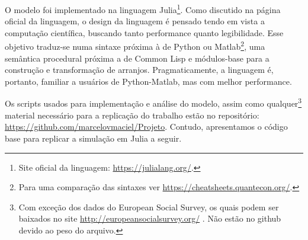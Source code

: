 O modelo foi implementado na linguagem Julia\footnote{Site oficial da linguagem:
\url{https://julialang.org/}.}. Como discutido na página oficial da linguagem, o
design da linguagem é pensado tendo em vista a computação científica, buscando
tanto performance quanto legibilidade. Esse objetivo traduz-se numa sintaxe
próxima à de Python ou Matlab\footnote{Para uma comparação das sintaxes ver
\url{https://cheatsheets.quantecon.org/}.}, uma semântica procedural próxima a
de Common Lisp e módulos-base  para a construção e transformação de
arranjos. Pragmaticamente, a linguagem é, portanto, familiar a usuários de
Python-Matlab, mas com melhor performance.

Os scripts usados para implementação e análise do modelo, assim como
qualquer\footnote{Com exceção dos dados do European Social Survey, os quais
podem ser baixados no site \url{http://europeansocialsurvey.org/} . Não estão no
github devido ao peso do arquivo.} material necessário para a replicação do
trabalho estão no repositório: \url{https://github.com/marcelovmaciel/Projeto}.
Contudo, apresentamos o código base para replicar a simulação em Julia a seguir.


